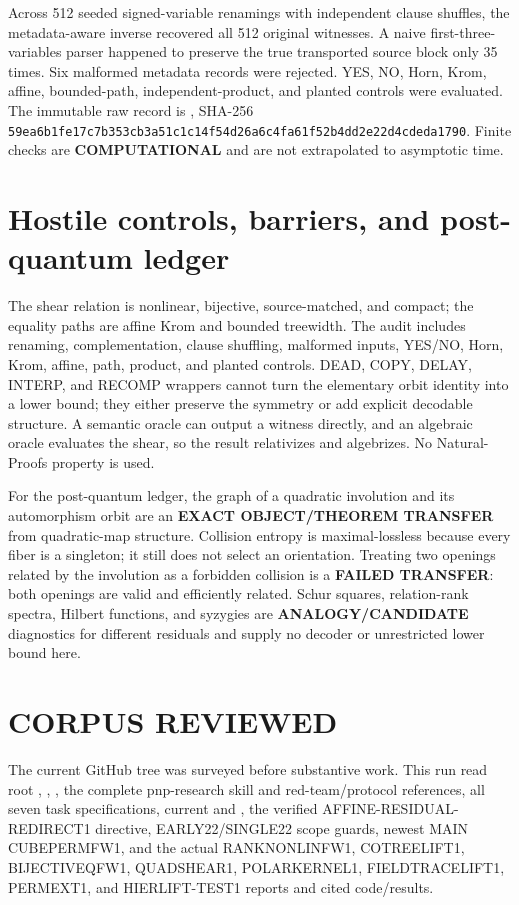 \documentclass[11pt]{article}
\newcommand{\COMP}{\textbf{COMPUTATIONAL}}
\begin{document}
Across 512 seeded signed-variable renamings with independent clause shuffles,
the metadata-aware inverse recovered all 512 original witnesses.  A naive
first-three-variables parser happened to preserve the true transported source
block only 35 times.  Six malformed metadata records were rejected.  YES,
NO, Horn, Krom, affine, bounded-path, independent-product, and planted controls
were evaluated.  The immutable raw record is
,
SHA-256
\texttt{59ea6b1fe17c7b353cb3a51c1c14f54d26a6c4fa61f52b4dd2e22d4cdeda1790}.
Finite checks are \COMP{} and are not extrapolated to asymptotic time.

\section{Hostile controls, barriers, and post-quantum ledger}
The shear relation is nonlinear, bijective, source-matched, and compact; the
equality paths are affine Krom and bounded treewidth.  The audit includes
renaming, complementation, clause shuffling, malformed inputs, YES/NO, Horn,
Krom, affine, path, product, and planted controls.  DEAD, COPY, DELAY,
INTERP, and RECOMP wrappers cannot turn the elementary orbit identity into a
lower bound; they either preserve the symmetry or add explicit decodable
structure.  A semantic oracle can output a witness directly, and an algebraic
oracle evaluates the shear, so the result relativizes and algebrizes.  No
Natural-Proofs property is used.

For the post-quantum ledger, the graph of a quadratic involution and its
automorphism orbit are an \textbf{EXACT OBJECT/THEOREM TRANSFER} from
quadratic-map structure.  Collision entropy is maximal-lossless because every
fiber is a singleton; it still does not select an orientation.  Treating two
openings related by the involution as a forbidden collision is a
\textbf{FAILED TRANSFER}: both openings are valid and efficiently related.
Schur squares, relation-rank spectra, Hilbert functions, and syzygies are
\textbf{ANALOGY/CANDIDATE} diagnostics for different residuals and supply no
decoder or unrestricted lower bound here.

\section{CORPUS REVIEWED}
The current GitHub tree was surveyed before substantive work.  This run read
root , , , the complete
pnp-research skill and red-team/protocol references, all seven task
specifications, current  and , the verified
AFFINE-RESIDUAL-REDIRECT1 directive, EARLY22/SINGLE22 scope guards, newest MAIN
CUBEPERMFW1, and the actual RANKNONLINFW1, COTREELIFT1, BIJECTIVEQFW1,
QUADSHEAR1, POLARKERNEL1, FIELDTRACELIFT1, PERMEXT1, and HIERLIFT-TEST1
reports and cited code/results.
\end{document}
